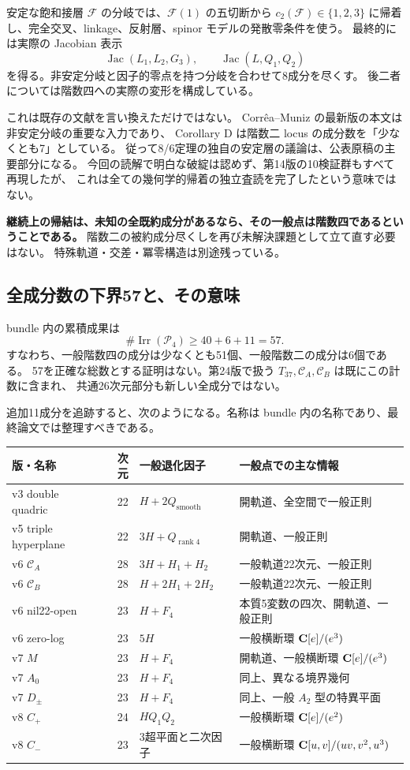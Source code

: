 \documentclass[11pt,a4paper]{ltjsarticle}
\newcommand{\cP}{\mathscr P_4}\newcommand{\OO}{\mathcal O}
\DeclareMathOperator{\rank}{rank}\DeclareMathOperator{\Spec}{Spec}
\DeclareMathOperator{\Irr}{Irr}
\theoremstyle{remark}\newtheorem{remark}[proposition]{注意}
\begin{document}
安定な飽和接層 $\mathcal F$ の分岐では、$\mathcal F(1)$ の五切断から
$c_2(\mathcal F)\in\{1,2,3\}$ に帰着し、完全交叉、linkage、反射層、spinor モデルの発散零条件を使う。
最終的には実際の Jacobian 表示
\[
 \operatorname{Jac}(L_1,L_2,G_3),\qquad
 \operatorname{Jac}(L,Q_1,Q_2)
\]
を得る。非安定分岐と因子的零点を持つ分岐を合わせて8成分を尽くす。
後二者については階数四への実際の変形を構成している。

これは既存の文献を言い換えただけではない。
Corrêa--Muniz の最新版の本文は非安定分岐の重要な入力であり、
Corollary D は階数二 locus の成分数を「少なくとも7」としている\cite{CM}。
従って8/6定理の独自の安定層の議論は、公表原稿の主要部分になる。
今回の読解で明白な破綻は認めず、第14版の10検証群もすべて再現したが、
これは全ての幾何学的帰着の独立査読を完了したという意味ではない。

\textbf{継続上の帰結は、未知の全既約成分があるなら、その一般点は階数四であるということである。}
階数二の被約成分尽くしを再び未解決課題として立て直す必要はない。
特殊軌道・交差・冪零構造は別途残っている。

\subsection{全成分数の下界57と、その意味}

bundle 内の累積成果は
\[
 \#\Irr(\cP)\ge 40+6+11=57.
\]
すなわち、一般階数四の成分は少なくとも51個、一般階数二の成分は6個である。
57を正確な総数とする証明はない。第24版で扱う $T_{37},\mathcal C_A,\mathcal C_B$ は既にこの計数に含まれ、
共通26次元部分も新しい全成分ではない。

追加11成分を追跡すると、次のようになる。名称は bundle 内の名称であり、最終論文では整理すべきである。
\begin{center}\small
\begin{tabular}{@{}p{29mm}rp{44mm}p{64mm}@{}}\toprule
版・名称 & 次元 & 一般退化因子 & 一般点での主な情報\\\midrule
v3 double quadric &22& $H+2Q_{\mathrm{smooth}}$ & 開軌道、全空間で一般正則\\
v5 triple hyperplane &22& $3H+Q_{\rank4}$ & 開軌道、一般正則\\
v6 $\mathcal C_A$ &28& $3H+H_1+H_2$ & 一般軌道22次元、一般正則\\
v6 $\mathcal C_B$ &28& $H+2H_1+2H_2$ & 一般軌道22次元、一般正則\\
v6 nil22-open &23& $H+F_4$ & 本質5変数の四次、開軌道、一般正則\\
v6 zero-log &23& $5H$ & 一般横断環 $\mathbf C[e]/(e^3)$\\
v7 $M$ &23& $H+F_4$ & 開軌道、一般横断環 $\mathbf C[e]/(e^3)$\\
v7 $A_0$ &23& $H+F_4$ & 同上、異なる境界幾何\\
v7 $D_{\pm}$ &23& $H+F_4$ & 同上、一般 $A_2$ 型の特異平面\\
v8 $C_+$ &24& $HQ_1Q_2$ & 一般横断環 $\mathbf C[e]/(e^2)$\\
v8 $C_-$ &23& 3超平面と二次因子 & 一般横断環 $\mathbf C[u,v]/(uv,v^2,u^3)$\\\bottomrule
\end{tabular}
\end{center}
\end{document}
